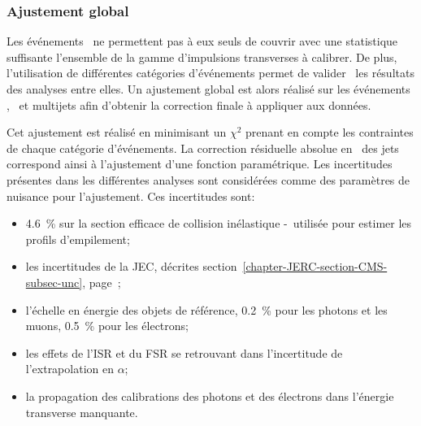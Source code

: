 





\clearpage

\subsubsection{Ajustement global}\label{chapter-JERC-section-JES-subsec-results-subsubsec-global_fit}
Les événements \Gjets\ ne permettent pas à eux seuls de couvrir avec une statistique suffisante l'ensemble de la gamme d'impulsions transverses à calibrer.
De plus, l'utilisation de différentes catégories d'événements permet de valider \aposteriori\ les résultats des analyses entre elles.
Un ajustement global est alors réalisé sur les événements \Zjets, \Gjets\ et multijets afin d'obtenir la correction finale à appliquer aux données.
\par Cet ajustement est réalisé en minimisant un $\chi^2$ prenant en compte les contraintes de chaque catégorie d'événements.
La correction résiduelle absolue en \pT\ des jets correspond ainsi à l'ajustement d'une fonction paramétrique.
Les incertitudes présentes dans les différentes analyses sont considérées comme des paramètres de nuisance pour l'ajustement. Ces incertitudes sont:
\begin{itemize}
\item \SI{4.6}{\%} sur la section efficace de collision inélastique \proton-\proton\ utilisée pour estimer les profils d'empilement;
\item les incertitudes de la JEC, décrites section~\ref{chapter-JERC-section-CMS-subsec-unc}, page~\pageref{chapter-JERC-section-CMS-subsec-unc};
\item l'échelle en énergie des objets de référence, \SI{0.2}{\%} pour les photons et les muons, \SI{0.5}{\%} pour les électrons;
\item les effets de l'ISR et du FSR se retrouvant dans l'incertitude de l'extrapolation en $\alpha$;
\item la propagation des calibrations des photons et des électrons dans l'énergie transverse manquante.
\end{itemize}
